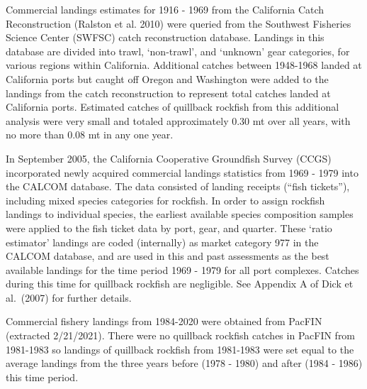 \documentclass[11pt,
  english,
  letterpaper,
]{article}
\begin{document}

Commercial landings estimates for 1916 - 1969 from the California Catch Reconstruction {(Ralston et al. 2010)\leavevmode\tagmcend\tagstructend} were queried from the Southwest Fisheries Science Center (SWFSC) catch reconstruction database. Landings in this database are divided into trawl, `non-trawl', and `unknown' gear categories, for various regions within California. Additional catches between 1948-1968 landed at California ports but caught off Oregon and Washington were added to the landings from the catch reconstruction to represent total catches landed at California ports. Estimated catches of quillback rockfish from this additional analysis were very small and totaled approximately 0.30 mt over all years, with no more than 0.08 mt in any one year.

\leavevmode\tagmcend\tagstructend\par


In September 2005, the California Cooperative Groundfish Survey (CCGS) incorporated newly acquired commercial landings statistics from 1969 - 1979 into the CALCOM database. The data consisted of landing receipts (``fish tickets''), including mixed species categories for rockfish. In order to assign rockfish landings to individual species, the earliest available species composition samples were applied to the fish ticket data by port, gear, and quarter. These `ratio estimator' landings are coded (internally) as market category 977 in the CALCOM database, and are used in this and past assessments as the best available landings for the time period 1969 - 1979 for all port complexes. Catches during this time for quillback rockfish are negligible. See Appendix A of Dick et al.~{(2007)\leavevmode\tagmcend\tagstructend} for further details.

\leavevmode\tagmcend\tagstructend\par


Commercial fishery landings from 1984-2020 were obtained from PacFIN (extracted 2/21/2021). There were no quillback rockfish catches in PacFIN from 1981-1983 so landings of quillback rockfish from 1981-1983 were set equal to the average landings from the three years before (1978 - 1980) and after (1984 - 1986) this time period.
\end{document}
